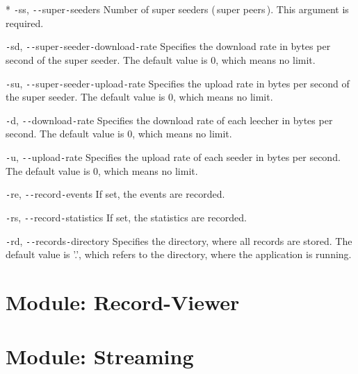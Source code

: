 \begin{flushleft}
* \texttt{-}ss, \texttt{-{}-}super\texttt{-}seeders
\linebreak
Number of super seeders (\,super peers\,). This argument is required.

\texttt{-}sd, \texttt{-{}-}super\texttt{-}seeder\texttt{-}download\texttt{-}rate
\linebreak
Specifies the download rate in bytes per second of the super seeder. The default value is 0, which means no limit.

\texttt{-}su, \texttt{-{}-}super\texttt{-}seeder\texttt{-}upload\texttt{-}rate
\linebreak
Specifies the upload rate in bytes per second of the super seeder. The default value is 0, which means no limit.

\texttt{-}d, \texttt{-{}-}download\texttt{-}rate
\linebreak
Specifies the download rate of each leecher in bytes per second. The default value is 0, which means no limit.

\texttt{-}u, \texttt{-{}-}upload\texttt{-}rate
\linebreak
Specifies the upload rate of each seeder in bytes per second. The default value is 0, which means no limit.



\texttt{-}re, \texttt{-{}-}record\texttt{-}events
\linebreak
If set, the events are recorded.

\texttt{-}rs, \texttt{-{}-}record\texttt{-}statistics
\linebreak
If set, the statistics are recorded.

\texttt{-}rd, \texttt{-{}-}records\texttt{-}directory
\linebreak
Specifies the directory, where all records are stored. The default value is '.', which refers to the directory, where the application is running.
\end{flushleft}

\section{Module: Record-Viewer}
\label{sec:recordviewer}

\section{Module: Streaming}
\label{sec:streaming}

